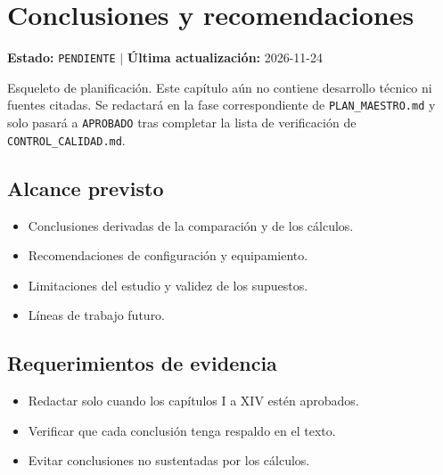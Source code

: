 \chapter{Conclusiones y recomendaciones}
\label{cap:15}

\begin{cajaestado}
\textbf{Estado:} \texttt{PENDIENTE} \quad$|$\quad
\textbf{Última actualización:} 2026-11-24

Esqueleto de planificación. Este capítulo aún no contiene desarrollo técnico ni
fuentes citadas. Se redactará en la fase correspondiente de
\texttt{PLAN\_MAESTRO.md} y solo pasará a \texttt{APROBADO} tras completar
la lista de verificación de \texttt{CONTROL\_CALIDAD.md}.
\end{cajaestado}

\section{Alcance previsto}
\begin{itemize}
  \item Conclusiones derivadas de la comparación y de los cálculos.
  \item Recomendaciones de configuración y equipamiento.
  \item Limitaciones del estudio y validez de los supuestos.
  \item Líneas de trabajo futuro.
\end{itemize}

\section{Requerimientos de evidencia}
\begin{itemize}
  \item Redactar solo cuando los capítulos I a XIV estén aprobados.
  \item Verificar que cada conclusión tenga respaldo en el texto.
  \item Evitar conclusiones no sustentadas por los cálculos.
\end{itemize}
